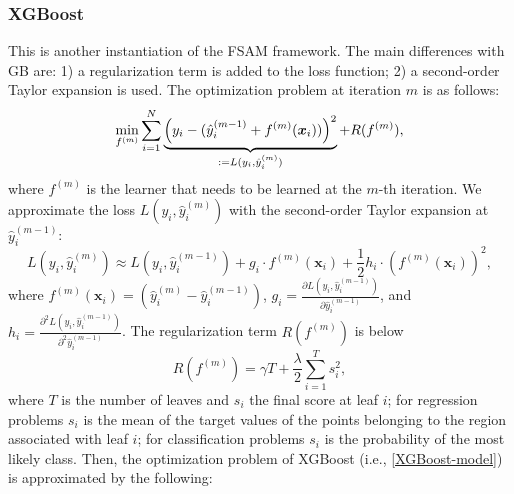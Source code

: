     \subsubsection{XGBoost}
        This is another instantiation of the FSAM framework.
        The main differences with GB are: 1) a regularization term is added to the loss function; 2) a second-order Taylor expansion is used. 
        The optimization problem at iteration $m$ is as follows:
            \begin{equation}\label{XGBoost-model}
                \min_{f^{(m)}} \sum_{i=1}^{N}{
                    \underbrace{\left( y_i - (\hat{y}^{(m-1)}_i + f^{(m)}(\bm{x}_i)) \right)^2}_{:=L(y_i, \hat{y}_i^{(m)}) } + R(f^{(m)}),
                }
            \end{equation}
        where $f^{(m)}$ is the learner that needs to be learned at the $m$-th iteration.
        We approximate the loss $L(y_i, \hat{y}_i^{(m)})$ with the second-order Taylor expansion at $\hat{y}^{(m-1)}_i$:
            \begin{equation}
                L(y_i, \hat{y}_i^{(m)}) \approx L(y_i, \hat{y}^{(m-1)}_i) + g_i \cdot f^{(m)}(\bm{x}_i) + \frac{1}{2} h_i \cdot (f^{(m)}(\bm{x}_i))^2,
            \end{equation}
        where $f^{(m)}(\bm{x}_i) = (\hat{y}_i^{(m)} - \hat{y}_i^{(m-1)})$, $g_i = \frac{\partial L(y_i, \hat{y}_i^{(m-1)})}{\partial \hat{y}_i^{(m-1)} }$, and $h_i = \frac{\partial^2 L(y_i, \hat{y}_i^{(m-1)})}{\partial^2 \hat{y}_i^{(m-1)} }$.
        The regularization term $R(f^{(m)})$ is below
            \begin{equation}
                R(f^{(m)}) = \gamma T + \frac{\lambda}{2}\sum_{i=1}^{T}{s_i^2},
            \end{equation}
        where $T$ is the number of leaves and $s_i$ the final score at leaf $i$; for regression problems $s_i$ is the mean of the target values of the points belonging to the region associated with leaf $i$; for classification problems $s_i$ is the probability of the most likely class.
        Then, the optimization problem of XGBoost (i.e., \eqref{XGBoost-model}) is approximated by the following:
